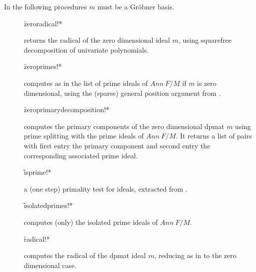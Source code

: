 In the following procedures $m$ must be a Gr\"obner basis.
\begin{description}

\item[]
  \begin{syntax}
    \f{zeroradical!*} 
  \end{syntax}
  \hypertarget{procedure:ZERORADICAL!*}{}
returns the radical of the zero dimensional ideal $m$, using
squarefree decomposition of univariate polynomials.

\item[]
  \begin{syntax}
    \f{zeroprimes!*} 
  \end{syntax}
  \hypertarget{procedure:ZEROPRIMES!*}{}
computes as in \cite{Gianni:88} the list of prime ideals of $Ann\ F/M$
if $m$ is zero dimensional, using the (sparse) general position
argument from \cite{Kredel:88a}.

\item[]
  \begin{syntax}
    \f{zeroprimarydecomposition!*} 
  \end{syntax}
  \hypertarget{procedure:ZEROPRIMARYDECOMPOSITION!*}{}
computes the primary components of the zero dimensional dpmat $m$
using prime splitting with the prime ideals of $Ann\ F/M$. It returns
a list of pairs with first entry the primary component
and second entry the corresponding associated prime ideal.

\item[]
  \begin{syntax}
    \f{isprime!*} 
  \end{syntax}
  \hypertarget{procedure:ISPRIME!*}{}
a (one step) primality test for ideals, extracted from
\cite{Gianni:88}.

\item[]
  \begin{syntax}
    \f{isolatedprimes!*} 
  \end{syntax}
  \hypertarget{procedure:ISOLATEDPRIMES!*}{}
computes (only) the isolated prime ideals of $Ann\ F/M$.

\item[]
  \begin{syntax}
    \f{radical!*} 
  \end{syntax}
  \hypertarget{procedure:RADICAL!*}{}
computes the radical of the dpmat ideal $m$, reducing as in
\cite{Gianni:88} to the zero dimensional case.


\end{description}
